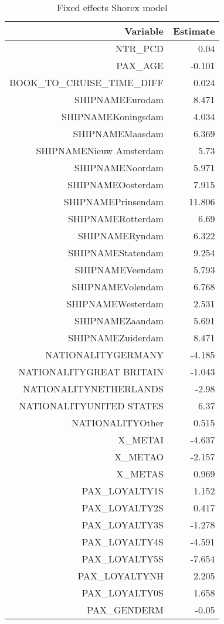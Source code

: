 \documentclass{article}
\begin{document}
\begin{table}[H]
	\centering 
	\begin{tabular}{rr}
		Variable & Estimate \\
		\hline 
		\hline 
		NTR\_PCD                   & 	0.04    \\ 
		PAX\_AGE	                  &      -0.101 \\  
		BOOK\_TO\_CRUISE\_TIME\_DIFF  &      0.024  \\ 
		SHIPNAMEEurodam	          &      8.471  \\ 
		SHIPNAMEKoningsdam	  &      4.034  \\ 
		SHIPNAMEMaasdam	          &      6.369  \\ 
		SHIPNAMENieuw Amsterdam	  &      5.73   \\
		SHIPNAMENoordam	          &      5.971  \\ 
		SHIPNAMEOosterdam         &    	7.915   \\
		SHIPNAMEPrinsendam	  &      11.806 \\  
		SHIPNAMERotterdam         &      6.69   \\
		SHIPNAMERyndam	          &      6.322  \\ 
		SHIPNAMEStatendam	  &      9.254  \\ 
		SHIPNAMEVeendam	          &      5.793  \\ 
		SHIPNAMEVolendam	  &      6.768  \\ 
		SHIPNAMEWesterdam	  &      2.531  \\ 
		SHIPNAMEZaandam	          &      5.691  \\ 
		SHIPNAMEZuiderdam	  &       8.471 \\  
		NATIONALITYGERMANY        &      -4.185 \\  
		NATIONALITYGREAT BRITAIN  &      -1.043 \\  
		NATIONALITYNETHERLANDS	  &     -2.98   \\   
		NATIONALITYUNITED STATES  &      6.37   \\   
		NATIONALITYOther          &      0.515  \\   
		X\_METAI	                  &     -4.637  \\    
		X\_METAO	                  &     -2.157  \\  
		X\_METAS	                  &     0.969   \\  
		PAX\_LOYALTY1S             &      1.152  \\  
		PAX\_LOYALTY2S             &      0.417  \\  
		PAX\_LOYALTY3S    	  &     -1.278  \\  
		PAX\_LOYALTY4S    	  &     -4.591  \\    
		PAX\_LOYALTY5S             &      -7.654 \\   
		PAX\_LOYALTYNH             &      2.205  \\    
		PAX\_LOYALTY0S	          &      1.658  \\  
		PAX\_GENDERM	          &      -0.05  \\  
		\hline 
		\hline 
	\end{tabular}
	\caption{Fixed effects Shorex model}
\end{table}
\end{document}
